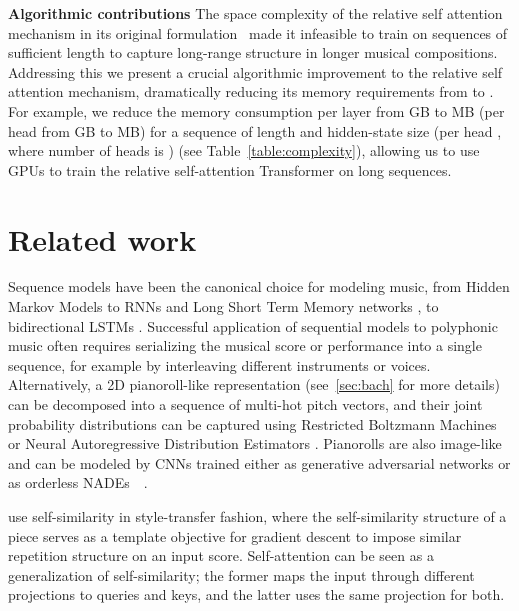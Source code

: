 \documentclass{article} \usepackage{iclr2019_conference,times}
\begin{document}
\textbf{Algorithmic contributions}\hspace{1em} The space complexity of the relative self attention mechanism in its original formulation~\citep{shaw2018self} made it infeasible to train on sequences of sufficient length to capture long-range structure in longer musical compositions.
Addressing this we present a crucial algorithmic improvement to the relative self attention mechanism, dramatically reducing its memory requirements from  to . For example, we reduce the memory consumption per layer from  GB to  MB (per head from  GB to  MB) for a sequence of length  and hidden-state size  (per head , where number of heads is ) (see Table~\ref{table:complexity}), allowing us to use GPUs to train the relative self-attention Transformer on long sequences.












\section{Related work}
Sequence models have been the canonical choice for modeling music, from Hidden Markov Models to RNNs 
and Long Short Term Memory networks \citep[e.g., ][]{eck2002finding, liang2016bachbot,oore2018time}, 
to bidirectional LSTMs \citep[e.g., ][]{hadjeres2016deepbach}.
Successful application of sequential models to polyphonic music often requires serializing the musical score or performance into a single sequence, for example by interleaving different instruments or voices.  
Alternatively, a 2D pianoroll-like representation (see~\ref{sec:bach} for more details) can be decomposed into a sequence of multi-hot pitch vectors, and their joint probability distributions can be captured using Restricted Boltzmann Machines \citep{smolensky1986information,hinton2006fast}
or Neural Autoregressive Distribution Estimators 
\citep[NADE; ][]{larochelle2011neural}.
Pianorolls are also image-like and can be modeled by CNNs trained either as generative adversarial networks \citep[e.g., ][]{dong2017musegan} 
or as orderless NADEs~\citep{uria2014deep,uria2016neural}~\citep[e.g., ][]{huang2017coconet}.





\citet{lattner2016imposing} use self-similarity in style-transfer fashion, where the self-similarity structure of a piece serves as a template objective for gradient descent to impose similar repetition structure on an input score.
Self-attention can be seen as a generalization of self-similarity; the former maps the input through different projections to queries and keys, and the latter uses the same projection for both.
\end{document}
